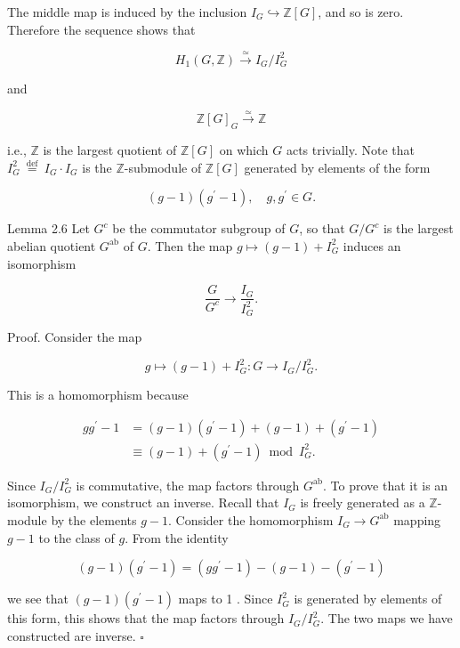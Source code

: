 \documentclass[10pt]{article}
\begin{document}
The middle map is induced by the inclusion $I_{G} \hookrightarrow \mathbb{Z}[G]$, and so is zero. Therefore the sequence shows that


\begin{equation*}
H_{1}(G, \mathbb{Z}) \xrightarrow{\simeq} I_{G} / I_{G}^{2} \tag{20}
\end{equation*}


and

$$
\mathbb{Z}[G]_{G} \xrightarrow{\simeq} \mathbb{Z}
$$

i.e., $\mathbb{Z}$ is the largest quotient of $\mathbb{Z}[G]$ on which $G$ acts trivially. Note that $I_{G}^{2} \stackrel{\text { def }}{=} I_{G} \cdot I_{G}$ is the $\mathbb{Z}$-submodule of $\mathbb{Z}[G]$ generated by elements of the form

$$
(g-1)\left(g^{\prime}-1\right), \quad g, g^{\prime} \in G .
$$

Lemma 2.6 Let $G^{c}$ be the commutator subgroup of $G$, so that $G / G^{c}$ is the largest abelian quotient $G^{\mathrm{ab}}$ of $G$. Then the map $g \mapsto(g-1)+I_{G}^{2}$ induces an isomorphism


\begin{equation*}
\frac{G}{G^{c}} \rightarrow \frac{I_{G}}{I_{G}^{2}} . \tag{21}
\end{equation*}


Proof. Consider the map

$$
g \mapsto(g-1)+I_{G}^{2}: G \rightarrow I_{G} / I_{G}^{2} .
$$

This is a homomorphism because

$$
\begin{aligned}
g g^{\prime}-1 & =(g-1)\left(g^{\prime}-1\right)+(g-1)+\left(g^{\prime}-1\right) \\
& \equiv(g-1)+\left(g^{\prime}-1\right) \bmod I_{G}^{2} .
\end{aligned}
$$

Since $I_{G} / I_{G}^{2}$ is commutative, the map factors through $G^{\mathrm{ab}}$. To prove that it is an isomorphism, we construct an inverse. Recall that $I_{G}$ is freely generated as a $\mathbb{Z}$-module by the elements $g-1$. Consider the homomorphism $I_{G} \rightarrow G^{\mathrm{ab}}$ mapping $g-1$ to the class of $g$. From the identity

$$
(g-1)\left(g^{\prime}-1\right)=\left(g g^{\prime}-1\right)-(g-1)-\left(g^{\prime}-1\right)
$$

we see that $(g-1)\left(g^{\prime}-1\right)$ maps to 1 . Since $I_{G}^{2}$ is generated by elements of this form, this shows that the map factors through $I_{G} / I_{G}^{2}$. The two maps we have constructed are inverse. \(\square\)
\end{document}
